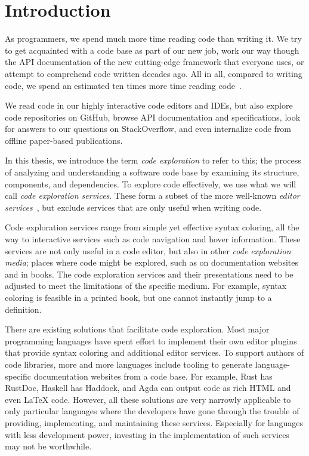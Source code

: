 
\chapter*{Introduction}\label{chap:introduction}

As programmers, we spend much more time reading code than writing it.
We try to get acquainted with a code base as part of our new job,
work our way though the API documentation of the new cutting-edge framework that everyone uses,
or attempt to comprehend code written decades ago.
All in all, compared to writing code, we spend an estimated ten times more time reading code~\autocite{clean_code}.

We read code in our highly interactive code editors and \acp{IDE},
but also explore code repositories on GitHub,
browse API documentation and specifications,
look for answers to our questions on StackOverflow,
and even internalize code from offline paper-based publications.

In this thesis, we introduce the term \emph{code exploration} to refer to this; the process of analyzing and understanding a software code base by examining its structure, components, and dependencies.
To explore code effectively, we use what we will call \emph{code exploration services}.
These form a subset of the more well-known \emph{editor services}~\autocite{ErdwegSV13}, but exclude services that are only useful when writing code.

Code exploration services range from simple yet effective syntax coloring, all the way to interactive services such as code navigation and hover information.
These services are not only useful in a code editor, but also in other \emph{code exploration media}; places where code might be explored, such as on documentation websites and in books.
The code exploration services and their presentations need to be adjusted to meet the limitations of the specific medium.
For example, syntax coloring is feasible in a printed book, but one cannot instantly jump to a definition.

There are existing solutions that facilitate code exploration.
Most major programming languages have spent effort to implement their own editor plugins that provide syntax coloring and additional editor services.
To support authors of code libraries, more and more languages include tooling to generate language-specific documentation websites from a code base.
For example, Rust has RustDoc, Haskell has Haddock, and Agda can output code as rich HTML and even LaTeX code.
However, all these solutions are very narrowly applicable to only particular languages where the developers have gone through the trouble of providing, implementing, and maintaining these services.
Especially for languages with less development power, investing in the implementation of such services may not be worthwhile.

